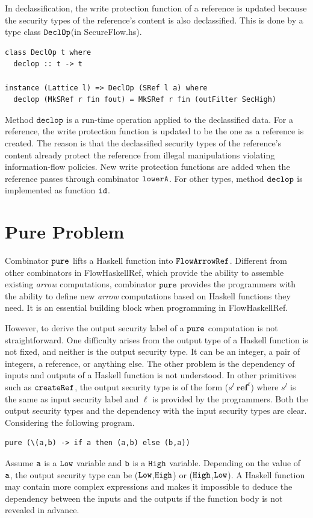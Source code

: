 \documentclass{report}
\newcommand{\co}[1]{$\cod{#1}$}
\newcommand{\st}{s^l}
\begin{document}
In declassification, the write protection function of a reference is updated because the security
types of the reference's content is also declassified. This is done by a type class \co{DeclOp}(in SecureFlow.hs).
\begin{Verbatim}[fontsize=\small]
class DeclOp t where
  declop :: t -> t

instance (Lattice l) => DeclOp (SRef l a) where
  declop (MkSRef r fin fout) = MkSRef r fin (outFilter SecHigh)
\end{Verbatim}
Method \co{declop} is a run-time operation applied to the declassified data. For a reference, the write protection
function is updated to be the one as a reference is created. The reason is that the declassified security types of the
reference's content already protect the reference from illegal manipulations violating information-flow policies. 
New write protection functions
are added when the reference passes through combinator \co{lowerA}. For other types, method \co{declop} is 
implemented as function \co{id}.

\section{Pure Problem}
\label{chap4:pure}
Combinator \co{pure} lifts a Haskell function into \co{FlowArrowRef}. 
Different from other combinators in FlowHaskellRef, which provide the ability to
assemble existing {\em arrow} computations, combinator \co{pure} provides the programmers with
the ability to define new {\em arrow} computations based on Haskell functions they need.
It is an essential building block when programming in FlowHaskellRef.

However, to derive the output security label of a \co{pure} computation is not straightforward.
One difficulty arises from the output type of a Haskell function is not fixed, and neither is the output
security type. It can be an integer, a pair of integers, a reference, or anything else.
The other problem is the dependency of inputs and outputs of a Haskell function is not understood.
In other primitives such as \co{createRef}, the output security type is of the form
($\st~\mathbf{ref}^\ell$) where $\st$ is the same as input security label and $\ell$ is provided by
the programmers. Both the output security types and the dependency with the input security types
are clear. Considering the following program.
\begin{Verbatim}[fontsize=\small]
 pure (\(a,b) -> if a then (a,b) else (b,a))
\end{Verbatim}
Assume \co{a} is a \co{Low} variable and \co{b} is a \co{High} variable. Depending on the value of \co{a},
the output security type can be (\co{Low},\co{High}) or (\co{High},\co{Low}). A Haskell function may
contain more complex expressions and makes it impossible to deduce the dependency between
the inputs and the outputs if the function body is not revealed in advance.
\end{document}
